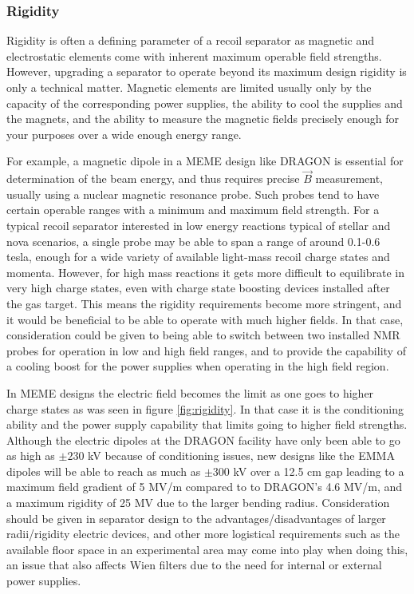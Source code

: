 \subsubsection{Rigidity}

Rigidity is often a defining parameter of a recoil separator as magnetic and electrostatic elements come with inherent maximum operable field strengths. However, upgrading a separator to operate beyond its maximum design rigidity is only a technical matter. Magnetic elements are limited usually only by the capacity of the corresponding power supplies, the ability to cool the supplies and the magnets, and the ability to measure the magnetic fields precisely enough for your purposes over a wide enough energy range. 

For example, a magnetic dipole in a MEME design like DRAGON is essential for determination of the beam energy, and thus requires precise $\vec{B}$ measurement, usually using a nuclear magnetic resonance probe.  Such probes tend to have certain operable ranges with a minimum and maximum field strength. For a typical recoil separator interested in low energy reactions typical of stellar and nova scenarios, a single probe may be able to span a range of around 0.1-0.6 tesla, enough for a wide variety of available light-mass recoil charge states and momenta. However, for high mass reactions it gets more difficult to equilibrate in very high charge states, even with charge state boosting devices installed after the gas target. This means the rigidity requirements become more stringent, and it would be beneficial to be able to operate with much higher fields. In that case, consideration could be given to being able to switch between two installed NMR probes for operation in low and high field ranges, and to provide the capability of a cooling boost for the power supplies when operating in the high field region.   

In MEME designs the electric field becomes the limit as one goes to higher charge states as was seen in figure \ref{fig:rigidity}. In that case it is the conditioning ability and the power supply capability that limits going to higher field strengths. Although the electric dipoles at the DRAGON facility have only been able to go as high as $\pm230$ kV because of conditioning issues, new designs like the EMMA dipoles will be able to reach as much as $\pm300$ kV over a 12.5 cm gap \cite{dav05} leading to a maximum field gradient of 5 MV/m compared to to DRAGON's 4.6 MV/m, and a maximum rigidity of 25 MV due to the larger bending radius. Consideration should be given in separator design to the advantages/disadvantages of larger radii/rigidity electric devices, and other more logistical requirements such as the available floor space in an experimental area may come into play when doing this, an issue that also affects Wien filters due to the need for internal or external power supplies. 
 
